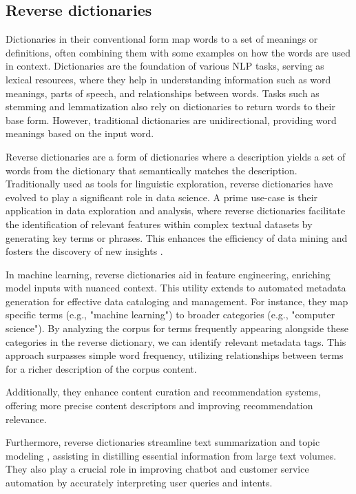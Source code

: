 \documentclass[12.5pt]{article}
\begin{document}
\subsection{Reverse dictionaries}

Dictionaries in their conventional form map words to a set of meanings or definitions, often combining them with some examples on how the words are used in context. Dictionaries are the foundation of various NLP tasks, serving as lexical resources, where they help in understanding information such as word meanings, parts of speech, and relationships between words. Tasks such as stemming and lemmatization also rely on dictionaries to return words to their base form. However, traditional dictionaries are unidirectional, providing word meanings based on the input word.

Reverse dictionaries are a form of dictionaries where a description yields a set of words from the dictionary that semantically matches the description. Traditionally used as tools for linguistic exploration, reverse dictionaries have evolved to play a significant role in data science. A prime use-case is their application in data exploration and analysis, where reverse dictionaries facilitate the identification of relevant features within complex textual datasets by generating key terms or phrases. This enhances the efficiency of data mining and fosters the discovery of new insights \cite{Chen2022}.

In machine learning, reverse dictionaries aid in feature engineering, enriching model inputs with nuanced context. This utility extends to automated metadata generation for effective data cataloging and management. For instance, they map specific terms (e.g., "machine learning") to broader categories (e.g., "computer science"). By analyzing the corpus for terms frequently appearing alongside these categories in the reverse dictionary, we can identify relevant metadata tags. This approach surpasses simple word frequency, utilizing relationships between terms for a richer description of the corpus content.

Additionally, they enhance content curation and recommendation systems, offering more precise content descriptors and improving recommendation relevance.

Furthermore, reverse dictionaries streamline text summarization and topic modeling \cite{Griffiths2004}, assisting in distilling essential information from large text volumes. They also play a crucial role in improving chatbot and customer service automation by accurately interpreting user queries and intents.
\end{document}
